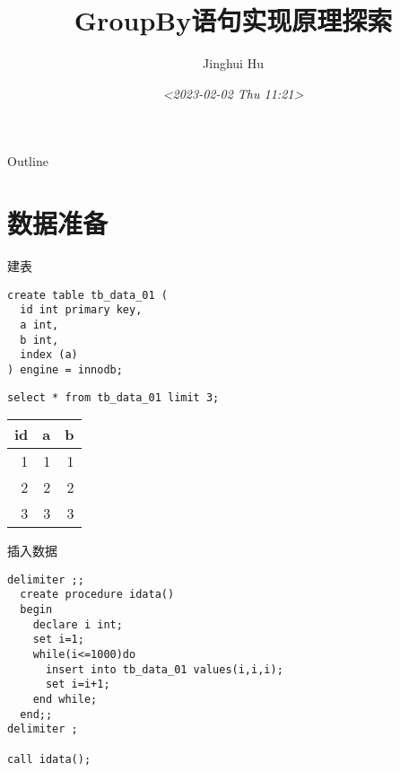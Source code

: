 \documentclass[presentation]{beamer}
\author{Jinghui Hu}
\date{\textit{<2023-02-02 Thu 11:21>}}
\title{GroupBy语句实现原理探索}
\begin{document}
\maketitle
\begin{frame}{Outline}
\tableofcontents
\end{frame}



\section{数据准备}
\label{sec:orgeb02b18}
\begin{frame}[label={sec:org4cd3734},fragile]{建表}
 \begin{verbatim}
create table tb_data_01 (
  id int primary key,
  a int,
  b int,
  index (a)
) engine = innodb;
\end{verbatim}

\begin{verbatim}
select * from tb_data_01 limit 3;
\end{verbatim}

\begin{center}
\begin{tabular}{rrr}
id & a & b\\
\hline
1 & 1 & 1\\
2 & 2 & 2\\
3 & 3 & 3\\
\end{tabular}
\end{center}
\end{frame}

\begin{frame}[label={sec:org80a6ac8},fragile]{插入数据}
 \begin{verbatim}
delimiter ;;
  create procedure idata()
  begin
    declare i int;
    set i=1;
    while(i<=1000)do
      insert into tb_data_01 values(i,i,i);
      set i=i+1;
    end while;
  end;;
delimiter ;

call idata();
\end{verbatim}
\end{frame}
\end{document}
